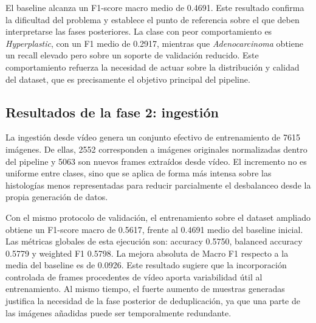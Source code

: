 ﻿\documentclass[10pt,a4paper,twocolumn,twoside]{article}
\begin{document}
El baseline alcanza un F1-score macro medio de 0.4691. Este resultado confirma la dificultad del problema y establece el punto de referencia sobre el que deben interpretarse las fases posteriores. La clase con peor comportamiento es \textit{Hyperplastic}, con un F1 medio de 0.2917, mientras que \textit{Adenocarcinoma} obtiene un recall elevado pero sobre un soporte de validación reducido. Este comportamiento refuerza la necesidad de actuar sobre la distribución y calidad del dataset, que es precisamente el objetivo principal del pipeline.

\subsection{Resultados de la fase 2: ingestión}
La ingestión desde vídeo genera un conjunto efectivo de entrenamiento de 7615 imágenes. De ellas, 2552 corresponden a imágenes originales normalizadas dentro del pipeline y 5063 son nuevos frames extraídos desde vídeo. El incremento no es uniforme entre clases, sino que se aplica de forma más intensa sobre las histologías menos representadas para reducir parcialmente el desbalanceo desde la propia generación de datos.

\begin{table}[t]
\centering
\small
\setlength{\tabcolsep}{4pt}
\caption{Composición del dataset tras la ingestión de vídeo}
\label{tab:phase2_distribution}
\end{table}

Con el mismo protocolo de validación, el entrenamiento sobre el dataset ampliado obtiene un F1-score macro de 0.5617, frente al 0.4691 medio del baseline inicial. Las métricas globales de esta ejecución son: accuracy 0.5750, balanced accuracy 0.5779 y weighted F1 0.5798. La mejora absoluta de Macro F1 respecto a la media del baseline es de 0.0926. Este resultado sugiere que la incorporación controlada de frames procedentes de vídeo aporta variabilidad útil al entrenamiento. Al mismo tiempo, el fuerte aumento de muestras generadas justifica la necesidad de la fase posterior de deduplicación, ya que una parte de las imágenes añadidas puede ser temporalmente redundante.
\end{document}
